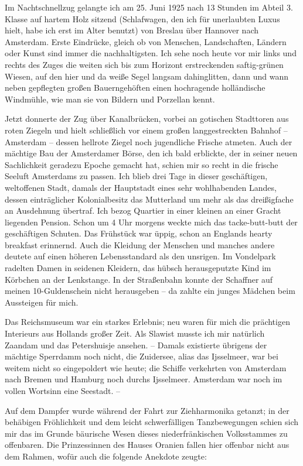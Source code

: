 Im Nachtschnellzug gelangte ich am 25. Juni 1925 nach 13 Stunden im Abteil 3. Klasse auf hartem Holz sitzend (Schlafwagen, den ich für unerlaubten Luxus hielt, habe ich erst im Alter benutzt) von Breslau über Hannover nach Amsterdam. Erste Eindrücke, gleich ob von Menschen, Landschaften, Ländern oder Kunst sind immer die nachhaltigsten. Ich sehe noch heute vor mir links und rechts des Zuges die weiten sich bis zum Horizont erstreckenden saftig-grünen Wiesen, auf den hier und da weiße Segel langsam dahinglitten, dann und wann neben gepflegten großen Bauerngehöften einen hochragende holländische Windmühle, wie man sie von Bildern und Porzellan kennt.

Jetzt donnerte der Zug über Kanalbrücken, vorbei an gotischen Stadttoren aus roten Ziegeln und hielt schließlich vor einem großen langgestreckten Bahnhof -- Amsterdam -- dessen hellrote Ziegel noch jugendliche Frische atmeten. Auch der mächtige Bau der Amsterdamer Börse, den ich bald erblickte, der in seiner neuen Sachlichkeit geradezu Epoche gemacht hat, schien mir so recht in die frische Seeluft Amsterdams zu passen. Ich blieb drei Tage in dieser geschäftigen, weltoffenen Stadt, damals der Hauptstadt eines sehr wohlhabenden Landes, dessen einträglicher Kolonialbesitz das Mutterland um mehr als das dreißigfache an Ausdehnung übertraf. Ich bezog Quartier in einer kleinen an einer Gracht liegenden Pension. Schon um 4 Uhr morgens weckte mich das tacke-butt-butt der geschäftigen Schuten. Das Frühstück war üppig, schon an Englands hearty breakfast erinnernd. Auch die Kleidung der Menschen und manches andere deutete auf einen höheren Lebensstandard als den unsrigen. Im Vondelpark radelten Damen in seidenen Kleidern, das hübsch herausgeputzte Kind im Körbchen an der Lenkstange. In der Straßenbahn konnte der Schaffner auf meinen 10-Guldenschein nicht herausgeben -- da zahlte ein junges Mädchen beim Aussteigen für mich.

Das Reichsmuseum war ein starkes Erlebnis; neu waren für mich die prächtigen Interieurs aus Hollands großer Zeit. Als Slawist musste ich mir natürlich Zaandam und das Petershuisje ansehen. -- Damals existierte übrigens der mächtige Sperrdamm noch nicht, die Zuidersee, alias das Ijsselmeer, war bei weitem nicht so eingepoldert wie heute; die Schiffe verkehrten von Amsterdam nach Bremen und Hamburg noch durchs Ijsselmeer. Amsterdam war noch im vollen Wortsinn eine Seestadt. --

Auf dem Dampfer wurde während der Fahrt zur Ziehharmonika getanzt; in der behäbigen Fröhlichkeit und dem leicht schwerfälligen Tanzbewegungen schien sich mir das im Grunde bäurische Wesen dieses niederfränkischen Volksstammes zu offenbaren. Die Prinzessinnen des Hauses Oranien fallen hier offenbar nicht aus dem Rahmen, wofür auch die folgende Anekdote zeugte:

